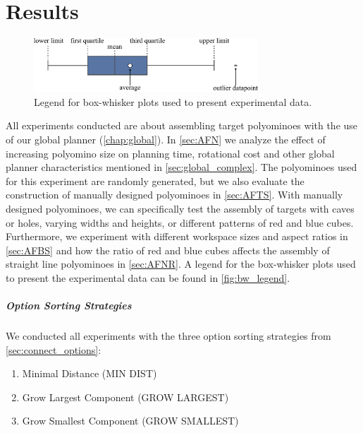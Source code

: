 \chapter{Results}
\label{chap:results}

\begin{figure}
	\centering
	\includegraphics[width=0.75\textwidth]{figures/plots/box_whisker_legend.pdf}
	\caption[Legend for box-whisker plots]{Legend for box-whisker plots used to present experimental data.}
	\label{fig:bw_legend}
\end{figure}

All experiments conducted are about assembling target polyominoes with the use of our global planner (\autoref{chap:global}).
In \autoref{sec:AFN} we analyze the effect of increasing polyomino size on planning time, rotational cost and other global planner characteristics mentioned in \autoref{sec:global_complex}.
The polyominoes used for this experiment are randomly generated, but we also evaluate the construction of manually designed polyominoes in \autoref{sec:AFTS}.
With manually designed polyominoes, we can specifically test the assembly of targets with caves or holes, varying widths and heights, or different patterns of red and blue cubes. 
Furthermore, we experiment with different workspace sizes and aspect ratios in \autoref{sec:AFBS} and how the ratio of red and blue cubes affects the assembly of straight line polyominoes in \autoref{sec:AFNR}.
A legend for the box-whisker plots used to present the experimental data can be found in \autoref{fig:bw_legend}.

\paragraph{Option Sorting Strategies}
We conducted all experiments with the three option sorting strategies from \autoref{sec:connect_options}:
\begin{enumerate}
	\item Minimal Distance (MIN DIST)
	\item Grow Largest Component (GROW LARGEST)
	\item Grow Smallest Component (GROW SMALLEST)
\end{enumerate}

